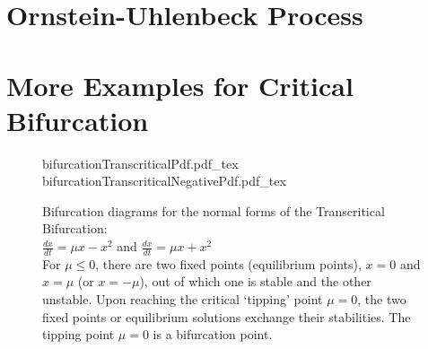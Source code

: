 \appendix
\section{Ornstein-Uhlenbeck Process}

\section{More Examples for Critical Bifurcation}

\begin{figure}[!ht]
	\centering
		\centering
		{bifurcationTranscriticalPdf.pdf_tex}\quad
		{bifurcationTranscriticalNegativePdf.pdf_tex}
	\caption{Bifurcation diagrams for the normal forms of the Transcritical Bifurcation: \\$\frac{dx}{dt} = \mu x - x^2$ and $\frac{dx}{dt} = \mu x + x^2$ \\For $\mu \leq 0$, there are two fixed points (equilibrium points), $x=0$ and $x = \mu$ (or $x = -\mu$), out of which one is stable and the other unstable. Upon reaching the critical `tipping' point $\mu=0$, the two fixed points or equilibrium solutions exchange their stabilities. The tipping point $\mu=0$ is a bifurcation point.}
	\label{fig:bifTranscritical}
\end{figure}